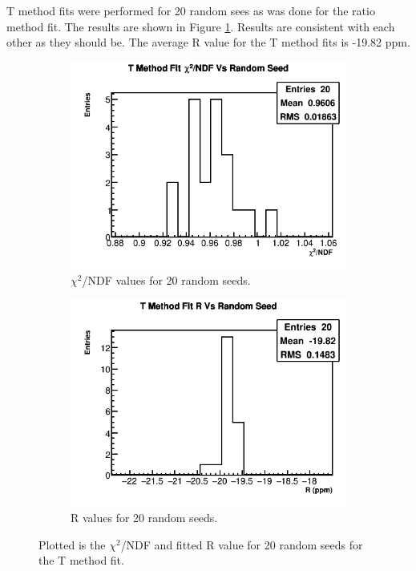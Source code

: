 \clearpage

	T method fits were performed for 20 random sees as was done for the ratio method fit. The results are shown in Figure \ref{Subfig:RVsRandomSeedTMethod}. Results are consistent with each other as they should be. The average R value for the T method fits is -19.82 ppm.

	\begin{figure}[]
	\centering
	    \begin{subfigure}[t]{0.45\textwidth}
		    \centering
			\includegraphics[width=\textwidth]{TMethod_Chi2NDF_Vs_Iter_Canv_hist}
		    \caption{$\chi^{2}$/NDF values for 20 random seeds.}
	    \end{subfigure}
	    \begin{subfigure}[t]{0.45\textwidth}
		    \centering
			\includegraphics[width=\textwidth]{TMethod_R_Vs_Iter_Canv_hist.png}
		    \caption{R values for 20 random seeds.}
		\label{Subfig:RVsRandomSeedTMethod}
	    \end{subfigure}%
	\caption[RandomSeedsTMethod]{Plotted is the $\chi^{2}$/NDF and fitted R value for 20 random seeds for the T method fit.}
	\label{fig:RandomSeedsTMethod}
	\end{figure}

